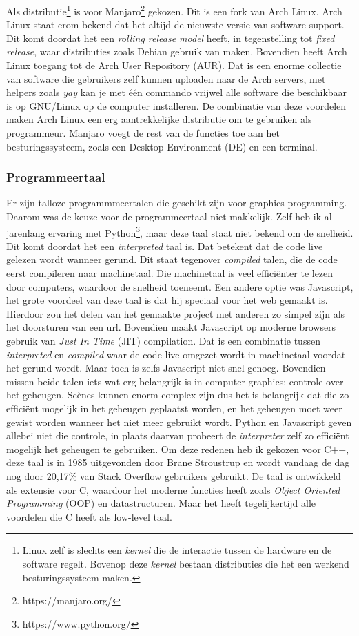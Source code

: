 \documentclass[12pt, a4paper]{article}
\begin{document}
Als distributie\footnote{Linux zelf is slechts een \emph{kernel} die de interactie tussen de hardware en de software regelt. Bovenop deze \emph{kernel} bestaan distributies die het een werkend besturingssysteem maken.} is voor Manjaro\footnote{https://manjaro.org/} gekozen. Dit is een fork van Arch Linux. Arch Linux staat erom bekend dat het altijd de nieuwste versie van software support. Dit komt doordat het een \emph{rolling release model} heeft, in tegenstelling tot \emph{fixed release}, waar distributies zoals Debian gebruik van maken. Bovendien heeft Arch Linux toegang tot de Arch User Repository (AUR). Dat is een enorme collectie van software die gebruikers zelf kunnen uploaden naar de Arch servers, met helpers zoals \emph{yay} kan je met één commando vrijwel alle software die beschikbaar is op GNU/Linux op de computer installeren. De combinatie van deze voordelen maken Arch Linux een erg aantrekkelijke distributie om te gebruiken als programmeur. Manjaro voegt de rest van de functies toe aan het besturingssysteem, zoals een Desktop Environment (DE) en een terminal.
\subsubsection{Programmeertaal}
Er zijn talloze programmmeertalen die geschikt zijn voor graphics programming. Daarom was de keuze voor de programmeertaal niet makkelijk. Zelf heb ik al jarenlang ervaring met Python\footnote{https://www.python.org/}, maar deze taal staat niet bekend om de snelheid. Dit komt doordat het een \emph{interpreted} taal is. Dat betekent dat de code live gelezen wordt wanneer gerund. Dit staat tegenover \emph{compiled} talen, die de code eerst compileren naar machinetaal. Die machinetaal is veel efficiënter te lezen door computers, waardoor de snelheid toeneemt. Een andere optie was Javascript, het grote voordeel van deze taal is dat hij speciaal voor het web gemaakt is. Hierdoor zou het delen van het gemaakte project met anderen zo simpel zijn als het doorsturen van een url. Bovendien maakt Javascript op moderne browsers gebruik van \textit{Just In Time} (JIT) compilation. Dat is een combinatie tussen \emph{interpreted} en \emph{compiled} waar de code live omgezet wordt in machinetaal voordat het gerund wordt. Maar toch is zelfs Javascript niet snel genoeg. Bovendien missen beide talen iets wat erg belangrijk is in computer graphics: controle over het geheugen. Scènes kunnen enorm complex zijn dus het is belangrijk dat die zo efficiënt mogelijk in het geheugen geplaatst worden, en het geheugen moet weer gewist worden wanneer het niet meer gebruikt wordt. Python en Javascript geven allebei niet die controle, in plaats daarvan probeert de \emph{interpreter} zelf zo efficiënt mogelijk het geheugen te gebruiken. Om deze redenen heb ik gekozen voor C++, deze taal is in 1985 uitgevonden door Brane Stroustrup en wordt vandaag de dag nog door 20,17\% van Stack Overflow gebruikers gebruikt\cite{StackOverflowSurvey}. De taal is ontwikkeld als extensie voor C, waardoor het moderne functies heeft zoals \emph{Object Oriented Programming} (OOP) en datastructuren. Maar het heeft tegelijkertijd alle voordelen die C heeft als low-level taal. 
\end{document}
